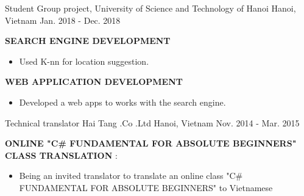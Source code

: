 \begin{cventries}
  \cventry
    {Student} %
    {Group project, University of Science and Technology of Hanoi} %
    {Hanoi, Vietnam} %
    {Jan. 2018 - Dec. 2018} %
    {
      \begin{cvitems} %
        \item {\textbf{SEARCH ENGINE DEVELOPMENT}
                \begin{itemize}
                  \item Used K-nn for location suggestion.
                \end{itemize}}
        \item {\textbf{WEB APPLICATION DEVELOPMENT}
                \begin{itemize}
                  \item Developed a web apps to works with the search engine.
                \end{itemize}}
      \end{cvitems}
    }

  \cventry
    {Technical translator} %
    {Hai Tang .Co .Ltd} %
    {Hanoi, Vietnam} %
    {Nov. 2014 - Mar. 2015} %
    {
      \begin{cvitems} %
        \item {\textbf{ONLINE "C# FUNDAMENTAL FOR ABSOLUTE BEGINNERS" CLASS TRANSLATION} :
                \begin{itemize}
                  \item Being an invited translator to translate an online class "C# FUNDAMENTAL FOR ABSOLUTE BEGINNERS" to Vietnamese
                \end{itemize}}
      \end{cvitems}
    }



\end{cventries}
